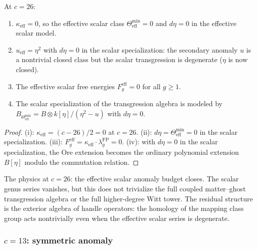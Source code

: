 \begin{proposition}
\label{prop:gravity-c26-degeneration}
At $c = 26$:
\begin{enumerate}[label=\textup{(\roman*)}]
\item $\kappa_{\mathrm{eff}} = 0$, so the effective scalar class
 $\Theta_{\mathrm{eff}}^{\min} = 0$ and $d\eta = 0$ in the
 effective scalar model.
\item $u_{\mathrm{eff}} = \eta^2$ with $d\eta = 0$
 in the scalar specialization:
 the secondary anomaly $u$ is a nontrivial closed class but
 the scalar transgression is degenerate ($\eta$ is now closed).
\item The effective scalar free energies
 $F_g^{\mathrm{eff}} = 0$ for all $g \ge 1$.
\item The scalar specialization of the transgression algebra is
 modeled by
 $B_{\Theta_{\mathrm{eff}}^{\min}}
 = B \otimes k[\eta]/(\eta^2 - u)$
 with $d\eta = 0$.
\end{enumerate}
\end{proposition}

\begin{proof}
(i): $\kappa_{\mathrm{eff}} = (c-26)/2 = 0$ at $c = 26$.
(ii): $d\eta = \Theta_{\mathrm{eff}}^{\min} = 0$ in the scalar
specialization.
(iii): $F_g^{\mathrm{eff}} = \kappa_{\mathrm{eff}} \cdot
\lambda_g^{\mathrm{FP}} = 0$.
(iv): with $d\eta = 0$ in the scalar specialization, the Ore extension becomes the ordinary
polynomial extension $B[\eta]$ modulo the commutation relation.
\end{proof}

The physics at $c = 26$: the effective scalar anomaly budget
closes. The scalar genus series vanishes, but this does not
trivialize the full coupled matter--ghost transgression algebra or
the full higher-degree Witt tower. The residual
structure is the exterior algebra of handle operators: the
homology of the mapping class group acts nontrivially even when the
effective scalar series is degenerate.

\subsubsection*{$c = 13$: symmetric anomaly}

